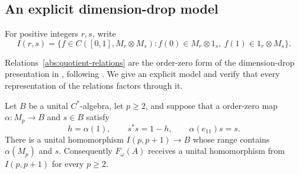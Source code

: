 \subsection{An explicit dimension-drop model}

For positive integers $r,s$, write
\[
 I(r,s)=\{f\in C([0,1],M_r\otimes M_s):
 f(0)\in M_r\otimes1_s,\ f(1)\in1_r\otimes M_s\}.
\]

Relations~\eqref{abs:quotient-relations} are the order-zero form of the dimension-drop
presentation in \cite[Proposition~2.1]{Sato2010}, following
\cite[Proposition~5.1, (iii)$\Rightarrow$(iv)]{RW2010}. We give an explicit model and verify
that every representation of the relations factors through it.

\begin{proposition}\label{prop:dimensiondrop}
Let $B$ be a unital $C^*$-algebra, let $p\ge2$, and suppose that a
\cpc order-zero map $\alpha:M_p\to B$ and $s\in B$ satisfy
\[
 h=\alpha(1),\qquad s^*s=1-h,\qquad \alpha(e_{11})s=s.
\]
There is a unital homomorphism
$I(p,p+1)\to B$ whose range contains $\alpha(M_p)$ and $s$.
Consequently $F_\omega(A)$ receives a unital homomorphism from
$I(p,p+1)$ for every $p\ge2$.
\end{proposition}

